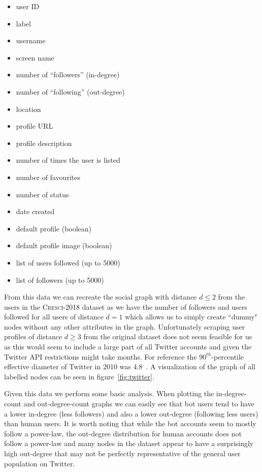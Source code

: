 \begin{multicols}{2}
\begin{itemize}
    \item user ID
    \item label
    \item username
    \item screen name
    \item number of “followers” (in-degree)
    \item number of “following” (out-degree)
    \item location
    \item profile URL
    \item profile description
    \item number of times the user is listed
    \item number of favourites
    \item number of status
    \item date created
    \item default profile (boolean)
    \item default profile image (boolean)
    \item list of users followed (up to 5000)
    \item list of followers (up to 5000)
\end{itemize}
\end{multicols}

From this data we can recreate the social graph with distance $d\leq2$ from the users in the \textsc{Cresci-2018} dataset as we have the number of followers and users followed for all users of distance $d=1$ which allows us to simply create ``dummy" nodes without any other attributes in the graph. Unfortunately scraping user profiles of distance $d\geq3$ from the original dataset does not seem feasible for us as this would seem to include a large part of all Twitter accounts and given the Twitter API restrictions might take months. For reference the $90^{th}$-percentile effective diameter of Twitter in 2010 was 4.8~\cite{kwak2010twitter}. A visualization of the graph of all labelled nodes can be seen in figure~\ref{fig:twitter}.

Given this data we perform some basic analysis. When plotting the in-degree-count and out-degree-count graphs we can easily see that bot users tend to have a lower in-degree (less followers) and also a lower out-degree (following less users) than human users. It is worth noting that while the bot accounts seem to mostly follow a power-law, the out-degree distribution for human accounts does not follow a power-law and many nodes in the dataset appear to have a surprisingly high out-degree that may not be perfectly representative of the general user population on Twitter.


